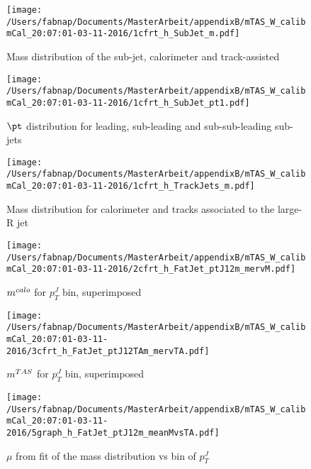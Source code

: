 \begin{figure}
 
\texttt{[image: /Users/fabnap/Documents/MasterArbeit/appendixB/mTAS\_W\_calibmCal\_20:07:01-03-11-2016/1cfrt\_h\_SubJet\_m.pdf]}
\caption{Mass distribution of the sub-jet, calorimeter and track-assisted}
 
\end{figure}
 
\begin{figure}
 
\texttt{[image: /Users/fabnap/Documents/MasterArbeit/appendixB/mTAS\_W\_calibmCal\_20:07:01-03-11-2016/1cfrt\_h\_SubJet\_pt1.pdf]}
\caption{$\pt$ distribution for leading, sub-leading and sub-sub-leading sub-jets}
 
\end{figure}
\begin{figure}
 
\texttt{[image: /Users/fabnap/Documents/MasterArbeit/appendixB/mTAS\_W\_calibmCal\_20:07:01-03-11-2016/1cfrt\_h\_TrackJets\_m.pdf]}
\caption{Mass distribution for calorimeter and tracks associated to the large-R jet}
 
\end{figure}
 
\begin{figure}
 
\texttt{[image: /Users/fabnap/Documents/MasterArbeit/appendixB/mTAS\_W\_calibmCal\_20:07:01-03-11-2016/2cfrt\_h\_FatJet\_ptJ12m\_mervM.pdf]}
\caption{$m^{calo}$ for $p_{T}^{J}$ bin, superimposed}
 
\end{figure}
 
\begin{figure}

\texttt{[image: /Users/fabnap/Documents/MasterArbeit/appendixB/mTAS\_W\_calibmCal\_20:07:01-03-11-2016/3cfrt\_h\_FatJet\_ptJ12TAm\_mervTA.pdf]}
\caption{$m^{TAS}$ for $p_{T}^{J}$ bin, superimposed}

\end{figure}

\begin{figure}

\texttt{[image: /Users/fabnap/Documents/MasterArbeit/appendixB/mTAS\_W\_calibmCal\_20:07:01-03-11-2016/5graph\_h\_FatJet\_ptJ12m\_meanMvsTA.pdf]}
\caption{$\mu$ from fit of the mass distribution vs bin of $p_{T}^{J}$ }

\end{figure}

